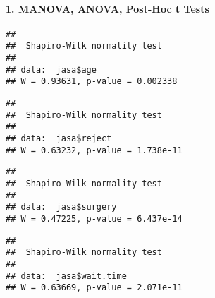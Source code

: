 \documentclass[]{article}
\newenvironment{Shaded}{\begin{snugshade}}{\end{snugshade}}
\newcommand{\KeywordTok}[1]{\textcolor[rgb]{0.13,0.29,0.53}{\textbf{#1}}}
\newcommand{\NormalTok}[1]{#1}
\newcommand{\OperatorTok}[1]{\textcolor[rgb]{0.81,0.36,0.00}{\textbf{#1}}}
\let\oldparagraph\paragraph
\renewcommand{\paragraph}[1]{\oldparagraph{#1}\mbox{}}
\begin{document}
\hypertarget{manova-anova-post-hoc-t-tests}{%
\paragraph{1. MANOVA, ANOVA, Post-Hoc t
Tests}\label{manova-anova-post-hoc-t-tests}}

\begin{Shaded}
\end{Shaded}

\begin{verbatim}
## 
##  Shapiro-Wilk normality test
## 
## data:  jasa$age
## W = 0.93631, p-value = 0.002338
\end{verbatim}

\begin{Shaded}
\end{Shaded}

\begin{verbatim}
## 
##  Shapiro-Wilk normality test
## 
## data:  jasa$reject
## W = 0.63232, p-value = 1.738e-11
\end{verbatim}

\begin{Shaded}
\end{Shaded}

\begin{verbatim}
## 
##  Shapiro-Wilk normality test
## 
## data:  jasa$surgery
## W = 0.47225, p-value = 6.437e-14
\end{verbatim}

\begin{Shaded}
\end{Shaded}

\begin{verbatim}
## 
##  Shapiro-Wilk normality test
## 
## data:  jasa$wait.time
## W = 0.63669, p-value = 2.071e-11
\end{verbatim}
\end{document}
